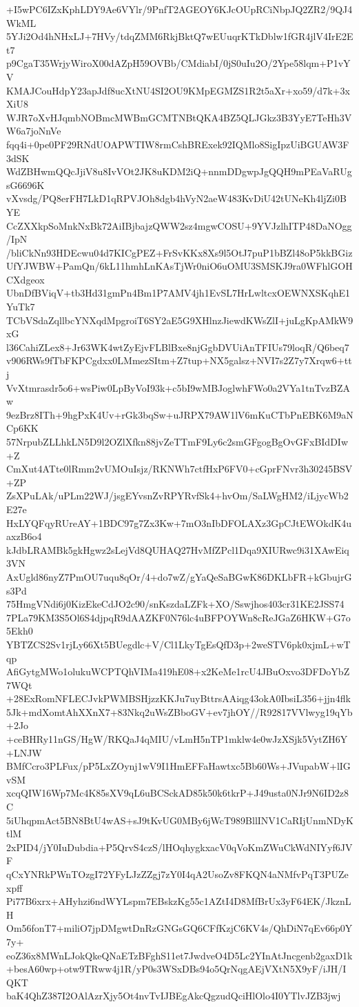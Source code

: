 +I5wPC6IZxKphLDY9Ae6VYlr/9PnfT2AGEOY6KJcOUpRCiNbpJQ2ZR2/9QJ4WkML
5YJi2Od4hNHxLJ+7HVy/tdqZMM6RkjBktQ7wEUuqrKTkDblw1fGR4jlV4IrE2Et7
p9CgaT35WrjyWiroX00dAZpH59OVBb/CMdiabI/0jS0uIu2O/2Ype58lqm+P1vYV
KMAJCouHdpY23apJdf8ucXtNU4SI2OU9KMpEGMZS1R2t5aXr+xo59/d7k+3xXiU8
WJR7oXvHJqmbNOBmcMWBmGCMTNBtQKA4BZ5QLJGkz3B3YyE7TeHh3VW6a7joNnVe
fqq4i+0pe0PF29RNdUOAPWTIW8rmCshBRExek92IQMlo8SigIpzUiBGUAW3F3dSK
WdZBHwmQQcJjiV8u8IvVOt2JK8uKDM2iQ+nnmDDgwpJgQQH9mPEaVaRUgsG6696K
vXvsdg/PQ8erFH7LkD1qRPVJOh8dgb4hVyN2aeW483KvDiU42tUNeKh4ljZi0BYE
CcZXXkpSoMnkNxBk72AiIBjbajzQWW2sz4mgwCOSU+9YVJzlhITP48DaNOgg/IpN
/bliCkNn93HDEcwu04d7KICgPEZ+FrSvKKx8Xs9l5OtJ7puP1bBZl48oP5kkBGiz
UfYJWBW+PamQn/6kL11hmhLnKAsTjWr0niO6uOMU3SMSKJ9ra0WFhlGOHCXdgeox
UbnDfBViqV+tb3Hd31gmPn4Bm1P7AMV4jh1EvSL7HrLwltcxOEWNXSKqhE1YuTk7
TCbVSdaZqllbcYNXqdMpgroiT6SY2aE5G9XHlnzJiewdKWsZlI+juLgKpAMkW9xG
l36CahiZLex8+Jr63WK4wtZyEjvFLBlBxe8njGgbDVUiAnTFIUs79loqR/Q6beq7
v906RWs9fTbFKPCgdxx0LMmezSItm+Z7tup+NX5galsz+NVI7s2Z7y7Xrqw6+ttj
VvXtmrasdr5o6+wsPiw0LpByVoI93k+c5bI9wMBJoglwhFWo0a2VYa1tnTvzBZAw
9ezBrz8ITh+9hgPxK4Uv+rGk3bqSw+uJRPX79AW1lV6mKuCTbPnEBK6M9aNCp6KK
57NrpubZLLhkLN5D9l2OZlXfkn88jvZeTTmF9Ly6c2smGFgogBgOvGFxBIdDIw+Z
CmXut4ATte0lRmm2vUMOuIsjz/RKNWh7ctfHxP6FV0+cGprFNvr3h30245BSV+ZP
ZsXPuLAk/uPLm22WJ/jsgEYvsnZvRPYRvfSk4+hvOm/SaLWgHM2/iLjycWb2E27e
HxLYQFqyRUreAY+1BDC97g7Zx3Kw+7mO3nIbDFOLAXz3GpCJtEWOkdK4uaxzB6o4
kJdbLRAMBk5gkHgwz2sLejVd8QUHAQ27HvMfZPcl1Dqa9XIURwc9i31XAwEiq3VN
AxUgld86nyZ7PmOU7uqu8qOr/4+do7wZ/gYaQeSaBGwK86DKLbFR+kGbujrGs3Pd
75HmgVNdi6j0KizEkeCdJO2c90/snKszdaLZFk+XO/Sswjhos403cr31KE2JSS74
7PLa79KM3S5Ol6S4djpqR9dAAZKF0N76lc4uBFPOYWn8cReJGaZ6HKW+G7o5Ekh0
YBTZCS2Sv1rjLy66Xt5BUegdlc+V/Cl1LkyTgEsQfD3p+2weSTV6pk0xjmL+wTqp
AfiGytgMWo1olukuWCPTQhVIMa419hE08+x2KeMe1rcU4JBuOxvo3DFDoYbZ7WQt
+28ExRomNFLECJvkPWMBSHjzzKKJu7uyBttrsAAiqg43okA0IbsiL356+jjn4flk
5Jk+mdXomtAhXXnX7+83Nkq2uWsZBboGV+ev7jhOY//R92817VVlwyg19qYb+2Jo
+ceBHRy11nGS/HgW/RKQaJ4qMIU/vLmH5nTP1mklw4e0wJzXSjk5VytZH6Y+LNJW
BMfCcro3PLFux/pP5LxZOynj1wV9I1HmEFFaHawtxc5Bb60Ws+JVupabW+lIGvSM
xcqQIW16Wp7Mc4K85sXV9qL6uBCSckAD85k50k6tkrP+J49usta0NJr9N6ID2z8C
5iUhqpmAct5BN8BtU4wAS+sJ9tKvUG0MBy6jWcT989BllINV1CaRIjUnmNDyKtlM
2xPID4/jY0IuDubdia+P5QrvS4czS/lHOqhygkxacV0qVoKmZWuCkWdNIYyf6JVF
qCxYNRkPWnTOzgI72YFyLJzZZgj7zY0I4qA2UsoZv8FKQN4aNMfvPqT3PUZexpff
Pi77B6xrx+AHyhzi6ndWYLspm7EBskzKg55c1AZtI4D8MfBrUx3yF64EK/JkznLH
Om56fonT7+miliO7jpDMgwtDnRzGNGsGQ6CFfKzjC6KV4s/QhDiN7qEv66p0Y7y+
eoZ36x8MWnLJokQkeQNaETzBFghS11et7JwdveO4D5Lc2YInAtJncgenb2gaxD1k
+besA60wp+otw9TRww4j1R/yP0s3WSxDBs94o5QrNqgAEjVXtN5X9yF/iJH/IQKT
baK4QhZ387I2OAlAzrXjy5Ot4nvTvIJBEgAkcQgzudQciHlOlo4I0YTlvJZB3jwj
